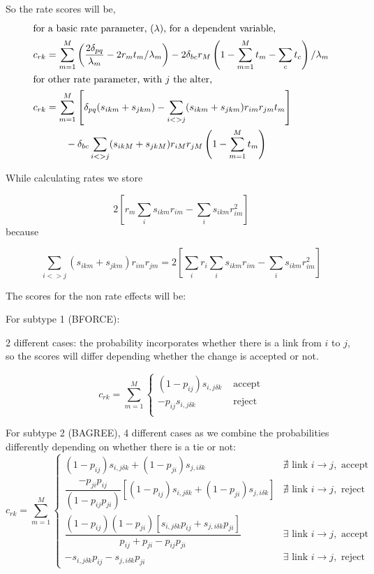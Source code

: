 \documentclass[12pt,a4paper]{article}
\renewcommand{\=}{\,=\,}
\newcommand{\+}{\,+\,}
\begin{document}
So the rate scores will be,
\begin{align*}
\intertext{for a basic rate parameter, $(\lambda)$, for a
dependent variable,}
c_{rk} &= \sum_{m=1}^M \left(
  \frac{2\delta_{pq}}{\lambda_m} - 2 r_m t_m / \lambda_m\right ) - 2\delta_{bc}
r_M  \left (1- \sum_{m=1}^M t_m - \sum_ct_c
  \right)/\lambda_m\\
\intertext{for other rate parameter, with $j$ the alter,}
c_{rk}&= \sum_{m=1}^M \left [\delta_{pq} (s_{ikm} + s_{jkm}) -
 \sum_{i<>j} (s_{ikm} + s_{jkm}) r_{im}r_{jm}t_m\right]\\
& \qquad - \delta_{bc}\sum_{i<>j} (s_{ikM} +s_{jkM})
r_{iM}r_{jM}\left (1- \sum_{m=1}^M t_m  \right)
\end{align*}

While calculating rates we store

$$ 2 \left [r_m \sum_i s_{ikm} r_{im} - \sum_i s_{ikm} r_{im}^2 \right]$$ because

$$
\sum_{i<>j} (s_{ikm} + s_{jkm}) r_{im}r_{jm} = 2 \left [\sum_ir_i \sum_i s_{ikm} r_{im}
  - \sum_i s_{ikm} r_{im}^2 \right]
$$

The scores for the non rate effects will be:

For subtype 1 (BFORCE):

2 different cases: the probability incorporates whether there is a link from $i$
to $j$, so the scores will differ depending whether the change is accepted or
not.

$$
c_{rk}= \sum_{m=1}^M \begin{cases}
 (1-p_{ij})s_{i,j\delta k} &\text{ accept}\\
-p_{ij} s_{i, j\delta k}  &  \text{ reject}\\
\end{cases}
$$

For subtype 2 (BAGREE), 4 different cases as we combine the probabilities
differently depending on whether there is a tie or not:
$$c_{rk}= \sum_{m=1}^M \begin{cases}
 (1-p_{ij})s_{i,j\delta k} + (1-p_{ji}) s_{j,i\delta k}
& \nexists \text{ link }  i \rightarrow j, \text{ accept}\\
\dfrac{ -p_{ji} p_{ij}}{(1 - p_{ij} p_{ji})}
\left[(1-p_{ij}) s_{i, j\delta k} +  (1-p_{ji})
s_{j, i\delta k}\right ] & \nexists \text{ link }
i \rightarrow j, \text{ reject}\\
\dfrac{(1 - p_{ij}) (1-p_{ji} )\left [s_{i, j\delta k} p_{ij}  +
 s_{j, i\delta k} p_{ji} \right] }
{p_{ij} + p_{ji} - p_{ij}p_{ji}}& \exists \text{ link } i \rightarrow j,
\text{ accept}\\
-s_{i, j\delta k} p_{ij} -
s_{j, i\delta k} p_{ji}
 &\exists \text{ link } i \rightarrow j,
\text{ reject}
\end{cases}
$$
\end{document}
